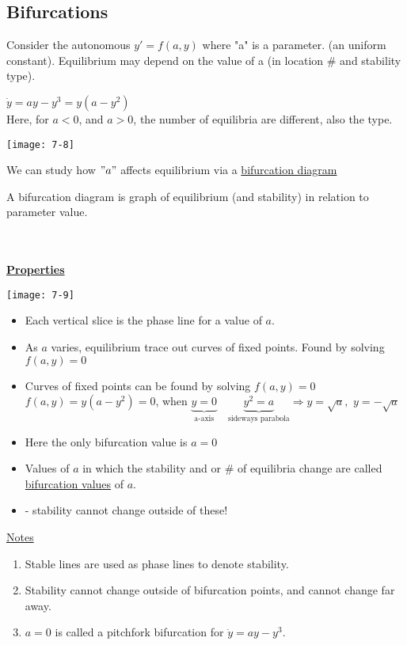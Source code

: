 \subsection*{Bifurcations}
Consider the autonomous $y' = f(a,y)$ where "a" is a parameter. (an uniform constant). Equilibrium may depend on the value of a (in location \# and stability type).
\begin{example-N}
	$\dot{y} = ay - y^3 = y(a-y^2)$\\
	Here, for $a < 0$, and $a > 0$, the number of equilibria are different, also the type.
	\begin{center}
		\texttt{[image: 7-8]}
	\end{center}
\end{example-N}
We can study how $"a"$ affects equilibrium via a \underline{bifurcation diagram}
\begin{definition-N}
	A bifurcation diagram is graph of equilibrium (and stability) in relation to parameter value.
\end{definition-N} 
\redhline\\\\
{\large \underline{\textbf{Properties}}}
\begin{center}
	\texttt{[image: 7-9]}
\end{center}
\begin{itemize}
	\item Each vertical slice is the phase line for a value of $a$.
	\item As $a$ varies, equilibrium trace out curves of fixed points. Found by solving $f(a,y) = 0$
	\item Curves of fixed points can be found by solving $f(a,y) = 0$\\
	$f(a,y) = y(a-y^2) = 0$, \quad when $\underbrace{y = 0}_{\text{a-axis}} \quad \underbrace{y^2 = a}_{\text{sideways parabola}} \Rightarrow y = \sqrt{a},$  $y = -\sqrt{a}$
	\item Here the only bifurcation value is $a = 0$
	\item Values of $a$ in which the stability and or \# of equilibria change are called \underline{bifurcation values} of $a$.
	\item {} - stability cannot change outside of these!
\end{itemize}
{\Large \underline{Notes}}
\begin{enumerate}[label=\protect\circled{\Roman*}]
	\item Stable lines are used as phase lines to denote stability.
	\item Stability cannot change outside of bifurcation points, and cannot change far away.
	\item $a=0$ is called a pitchfork bifurcation for $\dot{y} = ay-y^3$.
\end{enumerate}
